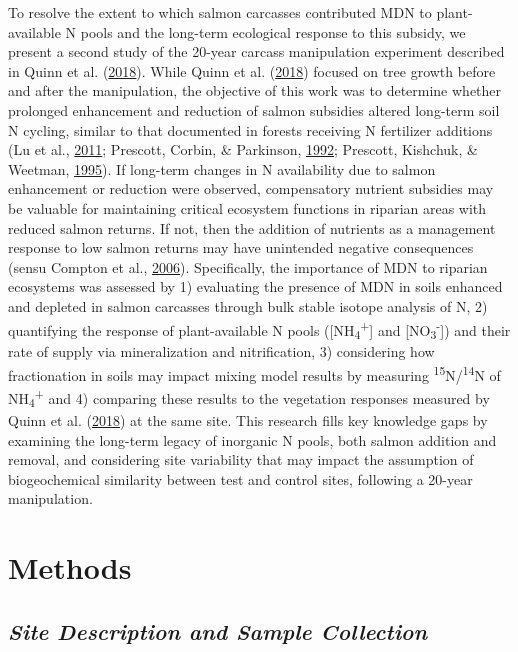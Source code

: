 \documentclass [11pt, proquest] {uwthesis}[2015/03/03]
\begin{document}
To resolve the extent to which salmon carcasses contributed MDN to
plant-available N pools and the long-term ecological response to this
subsidy, we present a second study of the 20-year carcass manipulation
experiment described in Quinn et al.
(\protect\hyperlink{ref-Quinn2018}{2018}). While Quinn et al.
(\protect\hyperlink{ref-Quinn2018}{2018}) focused on tree growth before
and after the manipulation, the objective of this work was to determine
whether prolonged enhancement and reduction of salmon subsidies altered
long-term soil N cycling, similar to that documented in forests
receiving N fertilizer additions (Lu et al.,
\protect\hyperlink{ref-Lu2011}{2011}; Prescott, Corbin, \& Parkinson,
\protect\hyperlink{ref-Prescott1992}{1992}; Prescott, Kishchuk, \&
Weetman, \protect\hyperlink{ref-Prescott1995}{1995}). If long-term
changes in N availability due to salmon enhancement or reduction were
observed, compensatory nutrient subsidies may be valuable for
maintaining critical ecosystem functions in riparian areas with reduced
salmon returns. If not, then the addition of nutrients as a management
response to low salmon returns may have unintended negative consequences
(sensu Compton et al., \protect\hyperlink{ref-Compton2006}{2006}).
Specifically, the importance of MDN to riparian ecosystems was assessed
by 1) evaluating the presence of MDN in soils enhanced and depleted in
salmon carcasses through bulk stable isotope analysis of N, 2)
quantifying the response of plant-available N pools
({[}NH\textsubscript{4}\textsuperscript{+}{]} and
{[}NO\textsubscript{3}\textsuperscript{-}{]}) and their rate of supply
via mineralization and nitrification, 3) considering how fractionation
in soils may impact mixing model results by measuring
\textsuperscript{15}N/\textsuperscript{14}N of
NH\textsubscript{4}\textsuperscript{+} and 4) comparing these results to
the vegetation responses measured by Quinn et al.
(\protect\hyperlink{ref-Quinn2018}{2018}) at the same site. This
research fills key knowledge gaps by examining the long-term legacy of
inorganic N pools, both salmon addition and removal, and considering
site variability that may impact the assumption of biogeochemical
similarity between test and control sites, following a 20-year
manipulation.

\section{Methods}\label{methods}

\subsection{\texorpdfstring{\emph{Site Description and Sample
Collection}}{Site Description and Sample Collection}}\label{site-description-and-sample-collection}
\end{document}
